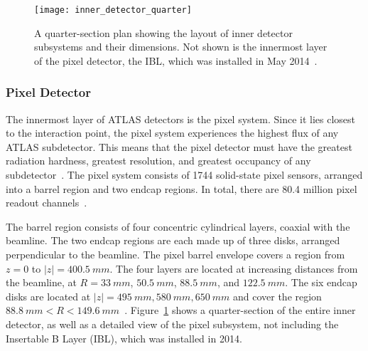\begin{figure}[!ht]\centering
\texttt{[image: inner\_detector\_quarter]}
\caption{A quarter-section plan showing the layout of inner detector subsystems and their dimensions.
Not shown is the innermost layer of the pixel detector, the IBL, which was installed in May 2014~\cite{lhc-machine-2008}.}
\label{fig:inner_detector_quarter}
\end{figure}

\subsubsection{Pixel Detector}\label{subsubsec:pixel}

The innermost layer of ATLAS detectors is the pixel system.
Since it lies closest to the interaction point, the pixel system experiences the highest flux of any ATLAS subdetector.
This means that the pixel detector must have the greatest radiation hardness, greatest resolution,
and greatest occupancy of any subdetector~\cite{atlas-detector-2008}.
The pixel system consists of 1744 solid-state pixel sensors, arranged into a barrel region and two endcap regions.
In total, there are 80.4 million pixel readout channels~\cite{atlas-detector-2008}.

The barrel region consists of four concentric cylindrical layers, coaxial with the beamline.
The two endcap regions are each made up of three disks, arranged perpendicular to the beamline.
The pixel barrel envelope covers a region from $z = 0$ to $|z|  = 400.5~mm$.
The four layers are located at increasing distances from the beamline, at $R = 33~mm$, $50.5~mm$, $88.5~mm$, and $122.5~mm$.
The six endcap disks are located at $|z| = 495~mm, 580~mm, 650~mm$ and cover the region $88.8~mm < R < 149.6~mm$~\cite{atlas-detector-2008}.
Figure~\ref{fig:inner_detector_quarter} shows a quarter-section of the entire inner detector, as well as a detailed view of the pixel subsystem, not including the Insertable B Layer (IBL), which was installed in 2014.

